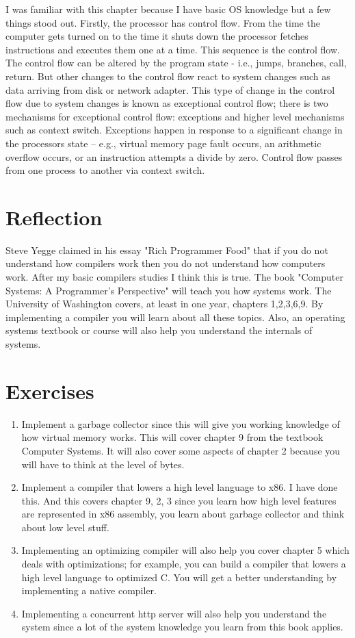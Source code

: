 \documentclass{amsbook}
\begin{document}
I was familiar with this chapter because I have basic OS knowledge but a few things stood out. Firstly, the processor has control flow. From the time the computer gets turned on to the time it shuts down the processor fetches instructions and executes them one at a time. This sequence is the control flow. The control flow can be altered by the program state - i.e., jumps, branches, call, return. But other changes to the control flow react to system changes such as data arriving from disk or network adapter. This type of change in the control flow due to system changes is known as exceptional control flow; there is two mechanisms for exceptional control flow: exceptions and higher level mechanisms such as context switch. Exceptions happen in response to a significant change in the processors  state -- e.g., virtual memory page fault occurs, an arithmetic overflow occurs, or an instruction attempts a divide by zero. Control flow passes from one process to another via context switch.

\section{Reflection}
Steve Yegge claimed in his essay "Rich Programmer Food" that if you do not understand how compilers work then you do not understand how computers work. After my basic compilers studies I think this is true. The book "Computer Systems: A Programmer's Perspective" will teach you how systems work. The University of Washington covers, at least in one year, chapters 1,2,3,6,9. By implementing a compiler you will learn about all these topics. Also, an operating systems textbook or course will also help you understand the internals of systems.
\section{Exercises}
\begin{enumerate}
    \item Implement a garbage collector since this will give you working knowledge of how virtual memory works. This will cover chapter 9 from the textbook Computer Systems. It will also cover some aspects of chapter 2 because you will have to think at the level of bytes.
    \item Implement a compiler that lowers a high level language to x86. I have done this. And this covers chapter 9, 2, 3 since you learn how high level features are represented in x86 assembly, you learn about garbage collector and think about low level stuff.
    \item Implementing an optimizing compiler will also help you cover chapter 5 which deals with optimizations; for example, you can build a compiler that lowers a high level language to optimized C. You will get a better understanding by implementing a native compiler.
    \item Implementing a concurrent http server will also help you understand the system since a lot of the system knowledge you learn from this book applies.
\end{enumerate}
\end{document}
